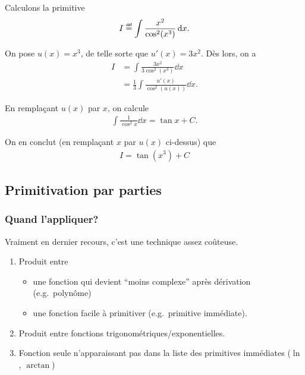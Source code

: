 \documentclass[main.tex]{subfiles}
\begin{document}
\begin{example}
    Calculons la primitive
    \begin{align}
        I \defeq \int \frac {x^2} {\cos^2 (x^3)} \dd x.
    \end{align}

    On pose $u(x) = x^3$,
    de telle sorte que $u'(x) = 3x^2$.
    Dès lors, on a
    \begin{align}
        I &= \int \frac {3 x^2} {3 \cos^2 (x^3)} \dd x\\
          &= \frac 1 3 \int \frac {u'(x)} {\cos^2 (u(x))} \dd x.
    \end{align}

    En remplaçant $u(x)$ par $x$,
    on calcule
    \begin{align}
        \int \frac 1 {\cos^2 x} \dd x = \tan x + C.
    \end{align}

    On en conclut (en remplaçant $x$ par $u(x)$ ci-dessus) que
    \begin{align}
        I = \tan (x^3) + C
    \end{align}
\end{example}

\subsection{Primitivation par parties}

\subsubsection{Quand l'appliquer?}

Vraiment en dernier recours,
c'est une technique assez coûteuse.

\begin{enumerate}
    \item Produit entre
        \begin{itemize}
            \item une fonction qui devient ``moins complexe'' après dérivation (e.g.~polynôme)
            \item une fonction facile à primitiver (e.g.~primitive immédiate).
        \end{itemize}
    \item Produit entre fonctions trigonométriques/exponentielles.
    \item Fonction seule n'apparaissant pas dans la liste des primitives immédiates ($\ln$, $\arctan$)
\end{enumerate}
\end{document}
